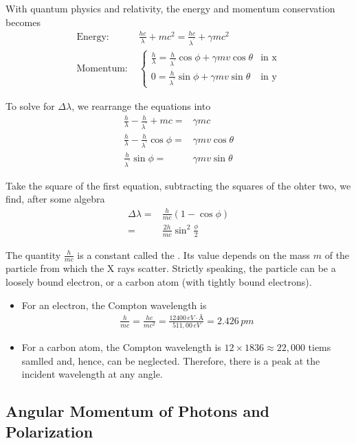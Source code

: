 With quantum physics and relativity, the energy and momentum conservation becomes
\begin{align*}
    \text{Energy: }&\frac{hc}{\lambda}+mc^2=\frac{hc}{\lambda^{\prime}}+\gamma mc^2\\
    \text{Momentum: }&\left\{\begin{array}{cc}
         \frac{h}{\lambda} = \frac{h}{\lambda^{\prime}}\cos\phi +\gamma mv \cos\theta & \text{in x}\\
         0=\frac{h}{\lambda^{\prime}}\sin\phi +\gamma mv \sin\theta & \text{in y}
    \end{array}\right.
\end{align*}

To solve for $\Delta \lambda$, we rearrange the equations into
\begin{align*}
    \frac{h}{\lambda}-\frac{h}{\lambda^{\prime}}+mc=&\gamma mc\\
    \frac{h}{\lambda}-\frac{h}{\lambda^{\prime}}\cos\phi=&\gamma  mv\cos\theta\\
    \frac{h}{\lambda^{\prime}}\sin\phi=&\gamma mv\sin\theta
\end{align*}

Take the square of the first equation, subtracting the squares of the ohter two, we find, after some algebra
\begin{align*}
    \Delta\lambda=&\frac{h}{mc}(1-\cos\phi)\\
    =&\frac{2h}{mc}\sin^2\frac{\phi}{2}
\end{align*}

The quantity $\frac{h}{mc}$ is a constant called the . Its value depends on the mass $m$ of the particle from which the X rays scatter. Strictly speaking, the particle can be a loosely bound
electron, or a carbon atom (with tightly bound electrons). 
\begin{itemize}
    \item For an electron, the Compton wavelength is 
    \begin{align*}
        \frac{h}{mc}=\frac{hc}{mc^2}=\frac{12400\, eV\cdot \text{\AA} }{511,00\,  eV}=2.426 \, pm
    \end{align*} 
    \item For a carbon atom, the Compton wavelength is $12\times 1836\approx 22,000$ tiems samlled and, hence, can be neglected. Therefore, there is a peak at the incident wavelength at any angle.
\end{itemize}

\subsection{Angular Momentum of Photons and Polarization}

